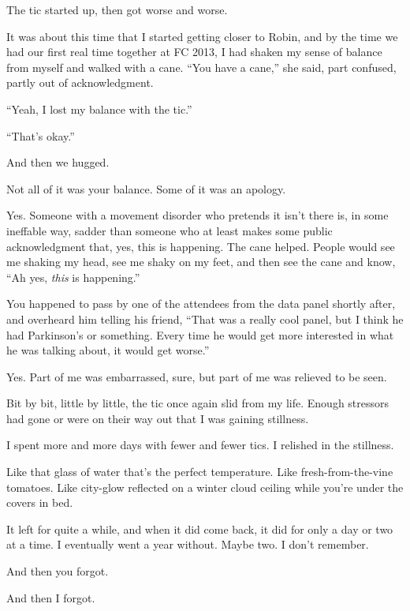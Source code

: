 The tic started up, then got worse and worse.

It was about this time that I started getting closer to Robin, and by the time we had our first real time together at FC 2013, I had shaken my sense of balance from myself and walked with a cane. ``You have a cane,'' she said, part confused, partly out of acknowledgment.

``Yeah, I lost my balance with the tic.''

``That's okay.''

And then we hugged.

\begin{ally}
Not all of it was your balance. Some of it was an apology.
\end{ally}
Yes. Someone with a movement disorder who pretends it isn't there is, in some ineffable way, sadder than someone who at least makes some public acknowledgment that, yes, this is happening. The cane helped. People would see me shaking my head, see me shaky on my feet, and then see the cane and know, ``Ah yes, \emph{this} is happening.''

\begin{ally}
You happened to pass by one of the attendees from the data panel shortly after, and overheard him telling his friend, ``That was a really cool panel, but I think he had Parkinson's or something. Every time he would get more interested in what he was talking about, it would get worse.''
\end{ally}
Yes. Part of me was embarrassed, sure, but part of me was relieved to be seen.
\newpage

\noindent Bit by bit, little by little, the tic once again slid from my life. Enough stressors had gone or were on their way out that I was gaining stillness.

I spent more and more days with fewer and fewer tics. I relished in the stillness.

\begin{ally}
Like that glass of water that's the perfect temperature. Like fresh-from-the-vine tomatoes. Like city-glow reflected on a winter cloud ceiling while you're under the covers in bed.
\end{ally}
It left for quite a while, and when it did come back, it did for only a day or two at a time. I eventually went a year without. Maybe two. I don't remember.

\begin{ally}
And then you forgot.
\end{ally}
And then I forgot.
\newpage

